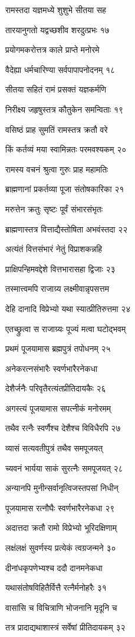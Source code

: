 रामस्तदा यज्ञमध्ये शुशुभे सीतया सह

तारयानुगतो यद्वच्छशीव शरदुत्प्रभः १७

प्रयोगमकरोत्तत्र काले प्राप्ते मनोरमे

वैदेह्या धर्मचारिण्या सर्वपापापनोदनम् १८

सीतया सहितं रामं प्रसक्तं यज्ञकर्मणि

निरीक्ष्य जहृषुस्तत्र कौतुकेन समन्विताः १९

वसिष्ठं प्राह सुमतिं रामस्तत्र क्रतौ वरे

किं कर्तव्यं मया स्वामिन्नतः परमवश्यकम् २०

रामस्य वचनं श्रुत्वा गुरुः प्राह महामतिः

ब्राह्मणानां प्रकर्तव्या पूजा संतोषकारिका २१

मरुत्तेन क्रतुः सृष्टः पूर्वं संभारसंभृतः

ब्राह्मणास्तत्र वित्ताद्यैस्तोषिता अभवंस्तदा २२

अत्यंतं वित्तसंभारं नेतुं विप्राशकन्नहि

प्राक्षिपन्हिमवद्देशे वित्तभारासहा द्विजाः २३

तस्मात्त्वमपि राजाग्र्य लक्ष्मीवान्नृपसत्तम

देहि दानादि विप्रेभ्यो यथा स्यात्प्रीतिरुत्तमा २४

एतच्छ्रुत्वा स राजाग्र्यः पूज्यं मत्वा घटोद्भवम्

प्रथमं पूजयामास ब्रह्मपुत्रं तपोधनम् २५

अनेकरत्नसंभारैः स्वर्णभारैरनेकधा

देशैर्जनैः परिवृतैरत्यंतप्रीतिदायकैः २६

अगस्त्यं पूजयामास सपत्नीकं मनोरमम्

तथैव रत्नैः स्वर्णैश्च देशैश्च विविधैरपि २७

व्यासं सत्यवतीपुत्रं तथैव समपूजयत्

च्यवनं भार्यया साकं सुरत्नैः समपूजयत् २८

अन्यानपि मुनीन्सर्वानृत्विजस्तपसां निधीन्

पूजयामास रत्नौघैः स्वर्णभारैरनेकधा २९

अदात्तदा क्रतौ रामो विप्रेभ्यो भूरिदक्षिणाम्

लक्षंलक्षं सुवर्णस्य प्रत्येकं त्वग्रजन्मने ३०

दीनांधकृपणेभ्यश्च ददौ दानमनेकधा

यथासंतोषविहितैर्वित्तै रत्नैर्मनोहरैः ३१

वासांसि च विचित्राणि भोजनानि मृदूनि च

तत्र प्रादाद्यथाशास्त्रं सर्वेषां प्रीतिदायकम् ३२

